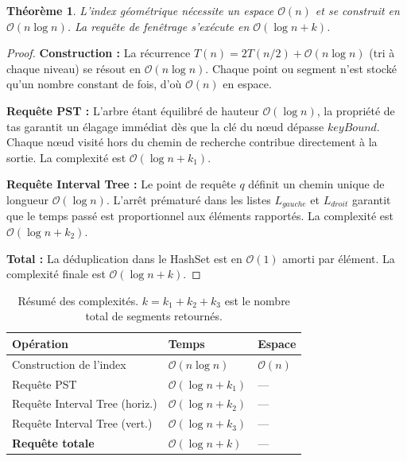 \documentclass[11pt,a4paper]{article}
\newtheorem{theorem}{Théorème}
\begin{document}
\begin{theorem}
L'index géométrique nécessite un espace $\mathcal{O}(n)$ et se construit en $\mathcal{O}(n \log n)$. La requête de fenêtrage s'exécute en $\mathcal{O}(\log n + k)$.
\end{theorem}

\begin{proof}
\textbf{Construction :} La récurrence $T(n) = 2T(n/2) + \mathcal{O}(n \log n)$ (tri à chaque niveau) se résout en $\mathcal{O}(n \log n)$. Chaque point ou segment n'est stocké qu'un nombre constant de fois, d'où $\mathcal{O}(n)$ en espace.

\textbf{Requête PST :} L'arbre étant équilibré de hauteur $\mathcal{O}(\log n)$, la propriété de tas garantit un élagage immédiat dès que la clé du nœud dépasse $keyBound$. Chaque nœud visité hors du chemin de recherche contribue directement à la sortie. La complexité est $\mathcal{O}(\log n + k_1)$.

\textbf{Requête Interval Tree :} Le point de requête $q$ définit un chemin unique de longueur $\mathcal{O}(\log n)$. L'arrêt prématuré dans les listes $L_{gauche}$ et $L_{droit}$ garantit que le temps passé est proportionnel aux éléments rapportés. La complexité est $\mathcal{O}(\log n + k_2)$.

\textbf{Total :} La déduplication dans le HashSet est en $\mathcal{O}(1)$ amorti par élément. La complexité finale est $\mathcal{O}(\log n + k)$.
\end{proof}

\begin{table}[h]
\centering
\begin{tabular}{@{}lll@{}}
\toprule
\textbf{Opération} & \textbf{Temps} & \textbf{Espace} \\
\midrule
Construction de l'index & $\mathcal{O}(n \log n)$ & $\mathcal{O}(n)$ \\
Requête PST & $\mathcal{O}(\log n + k_1)$ & --- \\
Requête Interval Tree (horiz.) & $\mathcal{O}(\log n + k_2)$ & --- \\
Requête Interval Tree (vert.) & $\mathcal{O}(\log n + k_3)$ & --- \\
\textbf{Requête totale} & $\mathcal{O}(\log n + k)$ & --- \\
\bottomrule
\end{tabular}
\caption{Résumé des complexités. $k = k_1 + k_2 + k_3$ est le nombre total de segments retournés.}
\end{table}
\end{document}
